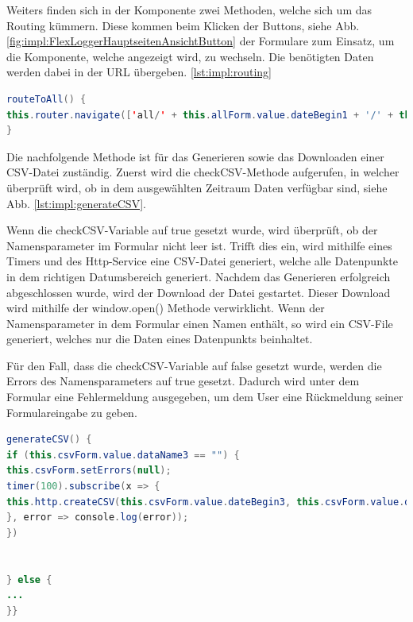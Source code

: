 Weiters finden sich in der Komponente zwei Methoden, welche sich um das Routing kümmern. Diese kommen beim Klicken der Buttons, siehe Abb. \ref{fig:impl:FlexLoggerHauptseitenAnsichtButton} der Formulare zum Einsatz, um die Komponente, welche angezeigt wird, zu wechseln. Die benötigten Daten werden dabei in der URL übergeben. \ref{lst:impl:routing}



\begin{lstlisting}[language=java,caption=Routing zu anderer Komponente,label=lst:impl:routing]
routeToAll() {
this.router.navigate(['all/' + this.allForm.value.dateBegin1 + '/' + this.allForm.value.timeBegin1 + '/' + this.allForm.value.dateEnd1 + '/' + this.allForm.value.timeEnd1], {relativeTo: this.route});
}
\end{lstlisting}




Die nachfolgende Methode ist für das Generieren sowie das Downloaden einer CSV-Datei zuständig. Zuerst wird die checkCSV-Methode aufgerufen, in welcher überprüft wird, ob in dem ausgewählten Zeitraum Daten verfügbar sind, siehe Abb. \ref{lst:impl:generateCSV}.


Wenn die checkCSV-Variable auf true gesetzt wurde, wird überprüft, ob der Namensparameter im Formular nicht leer ist. Trifft dies ein, wird mithilfe eines Timers und des Http-Service eine CSV-Datei generiert, welche alle Datenpunkte in dem richtigen Datumsbereich generiert. Nachdem das Generieren erfolgreich abgeschlossen wurde, wird der Download der Datei gestartet. Dieser Download wird mithilfe der window.open() Methode verwirklicht. Wenn der Namensparameter in dem Formular einen Namen enthält, so wird ein CSV-File generiert, welches nur die Daten eines Datenpunkts beinhaltet.


Für den Fall, dass die checkCSV-Variable auf false gesetzt wurde, werden die Errors des Namensparameters auf true gesetzt. Dadurch wird unter dem Formular eine Fehlermeldung ausgegeben, um dem User eine Rückmeldung seiner Formulareingabe zu geben.


\begin{lstlisting}[language=java,caption=CSV-File generieren,label=lst:impl:generateCSV]
generateCSV() {
if (this.csvForm.value.dataName3 == "") {
this.csvForm.setErrors(null);
timer(100).subscribe(x => {
this.http.createCSV(this.csvForm.value.dateBegin3, this.csvForm.value.dateEnd3, this.csvForm.value.timeBegin3, this.csvForm.value.timeEnd3, "C:/angular1/monitor.csv").subscribe(value => { window.open("http://localhost:8081/logEntry/download/");
}, error => console.log(error));
})


} else {
...
}}
\end{lstlisting}



